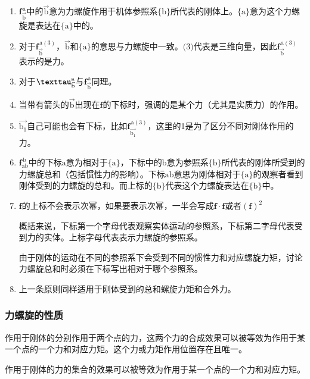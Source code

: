 \documentclass[12pt, a4paper, article, UTF8]{ctexart}
\begin{document}
\begin{enumerate}
\item $\mathbf{f}^{\,\text{a}}_{\vec{\text{b}}}$中的$\vec{\text{b}}$意为力螺旋作用于机体参照系$\{\text{b}\}$所代表的刚体上。$\{\text{a}\}$意为这个力螺旋是表达在$\{\text{a}\}$中的。
\item 对于$\mathbf{f}^{\,\text{a}(3)}_{\vec{\text{b}}}$，$\vec{\text{b}}$和$\{\text{a}\}$的意思与力螺旋中一致。$\text{(3)}$代表是三维向量，因此$\mathbf{f}^{\,\text{a}(3)}_{\vec{\text{b}}}$表示的是力。
\item 对于$\textbf{\texttau}^{\text{a}}_{\vec{\text{b}}}$与$\mathbf{f}^{\,\text{a}}_{\vec{\text{b}}}$同理。
\item 当带有箭头的$\vec{\text{b}}$出现在$\mathbf{f}$的下标时，强调的是某个力（尤其是实质力）的作用。
\item $\vec{\text{b}_1}$自己可能也会有下标，比如$\mathbf{f}^{\,\text{a}(3)}_{\vec{\text{b}_1}}$，这里的1是为了区分不同对刚体作用的力。
\item $\mathbf{f}_{\text{ab}}^{\,\text{b}}$中的下标$\text{a}$意为相对于$\{\text{a}\}$，下标中的$\text{b}$意为参照系$\{\text{b}\}$所代表的刚体所受到的力螺旋总和（包括惯性力的影响）。下标$\text{ab}$意思为刚体相对于$\{\text{a}\}$的观察者看到刚体受到的力螺旋的总和。而上标的$\{\text{b}\}$代表这个力螺旋表达在$\{\text{b}\}$中。
\item $\mathbf{f}$的上标不会表示次幂，如果要表示次幂，一半会写成$\mathbf{f}\cdot \mathbf{f}$或者$(\mathbf{f})^2$

概括来说，下标第一个字母代表观察实体运动的参照系，下标第二字母代表受到力的实体。上标字母代表表示力螺旋的参照系。

由于刚体的运动在不同的参照系下会受到不同的惯性力和对应螺旋力矩，讨论力螺旋总和时必须在下标写出相对于哪个参照系。

\item 上一条原则同样适用于刚体受到的总和螺旋力矩和合外力。
\end{enumerate}




\subsubsection{力螺旋的性质}
\begin{mytheorem}
作用于刚体的分别作用于两个点的力，这两个力的合成效果可以被等效为作用于某一个点的一个力和对应力矩。这个力或力矩作用位置存在且唯一。
\end{mytheorem}

\begin{mytheorem}
作用于刚体的力的集合的效果可以被等效为作用于某一个点的一个力和对应力矩。
\end{mytheorem}
\end{document}
